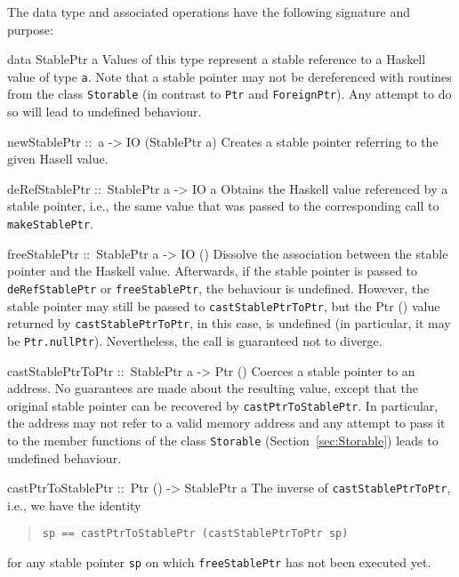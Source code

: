 \documentclass[a4paper,twosides]{article}
\makeatletter
\newcommand{\code}[1]{\texttt{#1}}      %
\newenvironment{codedesc}{%
  \list{}{\labelwidth\z@ %
    \let\makelabel\codedesclabel}
  }{%
  \endlist
  }
\newcommand*{\codedesclabel}[1]{%
  \hspace{-\leftmargin}
  \parbox[b]{\labelwidth}{\makebox[0pt][l]{\code{#1}}\\}\hfil\relax
  }
\makeatother
\begin{document}
The data type and associated operations have the following signature and
purpose:
%
\begin{codedesc}
\item[data StablePtr a] Values of this type represent a stable reference to a
  Haskell value of type \code{a}.  Note that a stable pointer may not be
  dereferenced with routines from the class \code{Storable} (in contrast to
  \code{Ptr} and \code{ForeignPtr}).  Any attempt to do so will lead to
  undefined behaviour.
  
\item[newStablePtr ::\ a -> IO (StablePtr a)] Creates a stable pointer
  referring to the given Hasell value.
  
\item[deRefStablePtr ::\ StablePtr a -> IO a] Obtains the Haskell value
  referenced by a stable pointer, i.e., the same value that was passed to the
  corresponding call to \code{makeStablePtr}.
  
\item[freeStablePtr ::\ StablePtr a -> IO ()] Dissolve the association between
  the stable pointer and the Haskell value. Afterwards, if the stable pointer
  is passed to \code{deRefStablePtr} or \code{freeStablePtr}, the behaviour is
  undefined.  However, the stable pointer may still be passed to
  \code{castStablePtrToPtr}, but the Ptr () value returned by
  \code{castStablePtrToPtr}, in this case, is undefined (in particular, it may
  be \code{Ptr.nullPtr}).  Nevertheless, the call is guaranteed not to
  diverge.
  
\item[castStablePtrToPtr ::\ StablePtr a -> Ptr ()] Coerces a stable pointer
  to an address. No guarantees are made about the resulting value, except that
  the original stable pointer can be recovered by \code{castPtrToStablePtr}.
  In particular, the address may not refer to a valid memory address and any
  attempt to pass it to the member functions of the class \code{Storable}
  (Section~\ref{sec:Storable}) leads to undefined behaviour.
  
\item[castPtrToStablePtr ::\ Ptr () -> StablePtr a] The inverse of
  \code{castStablePtrToPtr}, i.e., we have the identity
  \begin{quote}
\begin{verbatim}
sp == castPtrToStablePtr (castStablePtrToPtr sp)
\end{verbatim}
  \end{quote}
  for any stable pointer \code{sp} on which \code{freeStablePtr} has not been
  executed yet.
\end{codedesc}
\end{document}
